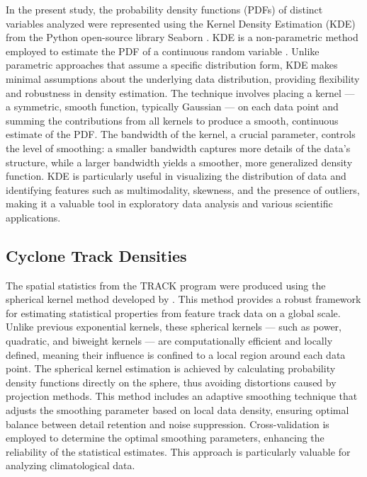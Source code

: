 In the present study, the probability density functions (PDFs) of distinct variables analyzed were represented using the Kernel Density Estimation (KDE) from the Python open-source library Seaborn \citep{waskom2021seaborn}. KDE is a non-parametric method employed to estimate the PDF of a continuous random variable \citep{parzen1962estimation,rosenblatt1956estimation}. Unlike parametric approaches that assume a specific distribution form, KDE makes minimal assumptions about the underlying data distribution, providing flexibility and robustness in density estimation. The technique involves placing a kernel — a symmetric, smooth function, typically Gaussian — on each data point and summing the contributions from all kernels to produce a smooth, continuous estimate of the PDF. The bandwidth of the kernel, a crucial parameter, controls the level of smoothing: a smaller bandwidth captures more details of the data's structure, while a larger bandwidth yields a smoother, more generalized density function. KDE is particularly useful in visualizing the distribution of data and identifying features such as multimodality, skewness, and the presence of outliers, making it a valuable tool in exploratory data analysis and various scientific applications.


\subsection{Cyclone Track Densities}

The spatial statistics from the TRACK program were produced using the spherical kernel method developed by \citet{hodges1996spherical}. This method provides a robust framework for estimating statistical properties from feature track data on a global scale. Unlike previous exponential kernels, these spherical kernels — such as power, quadratic, and biweight kernels — are computationally efficient and locally defined, meaning their influence is confined to a local region around each data point. The spherical kernel estimation is achieved by calculating probability density functions directly on the sphere, thus avoiding distortions caused by projection methods. This method includes an adaptive smoothing technique that adjusts the smoothing parameter based on local data density, ensuring optimal balance between detail retention and noise suppression. Cross-validation is employed to determine the optimal smoothing parameters, enhancing the reliability of the statistical estimates. This approach is particularly valuable for analyzing climatological data.

